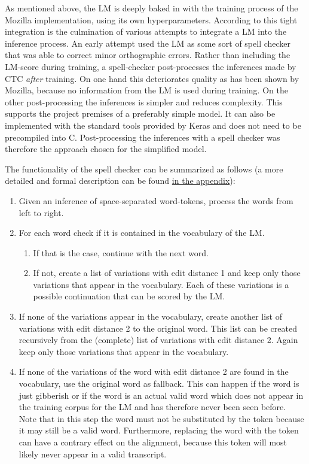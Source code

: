 As mentioned above, the \ac{LM} is deeply baked in with the training process of the Mozilla implementation, using its own hyperparameters. According to \cite{mozillajourney} this tight integration is the culmination of various attempts to integrate a \ac{LM} into the inference process. An early attempt used the \ac{LM} as some sort of spell checker that was able to correct minor orthographic errors. Rather than including the \ac{LM}-score during training, a spell-checker post-processes the inferences made by \ac{CTC} \textit{after} training. On one hand this deteriorates quality as has been shown by Mozilla, because no information from the \ac{LM} is used during training. On the other post-processing the inferences is simpler and reduces complexity. This supports the project premises of a preferably simple model. It can also be implemented with the standard tools provided by Keras and does not need to be precompiled into C. Post-processing the inferences with a spell checker was therefore the approach chosen for the simplified model.

The functionality of the spell checker can be summarized as follows (a more detailed and formal description can be found \hyperref[spellchecker]{in the appendix}): 

\begin{enumerate}
	\item Given an inference of space-separated word-tokens, process the words from left to right.
	\item For each word check if it is contained in the vocabulary of the \ac{LM}. 
	\begin{enumerate}
		\item If that is the case, continue with the next word. 
		\item If not, create a list of variations with edit distance 1 and keep only those variations that appear in the vocabulary. Each of these variations is a possible continuation that can be scored by the \ac{LM}. 
	\end{enumerate}
	\item If none of the variations appear in the vocabulary, create another list of variations with edit distance 2 to the original word. This list can be created recursively from the (complete) list of variations with edit distance 2. Again keep only those variations that appear in the vocabulary.	
	\item If none of the variations of the word with edit distance 2 are found in the vocabulary, use the original word as fallback. This can happen if the word is just gibberish or if the word is an actual valid word which does not appear in the training corpus for the \ac{LM} and has therefore never been seen before. Note that in this step the word must not be substituted by the  token because it may still be a valid word. Furthermore, replacing the word with the  token can have a contrary effect on the alignment, because this token will most likely never appear in a valid transcript. 
\end{enumerate}

